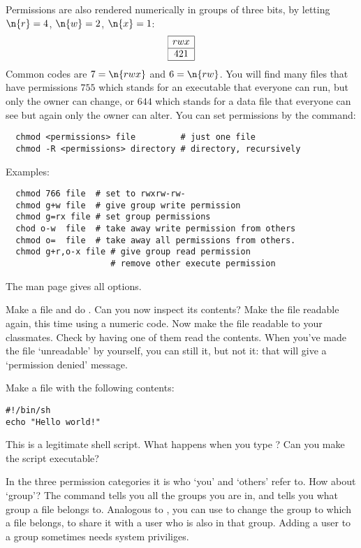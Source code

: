 Permissions are also rendered
numerically in groups of three bits, by letting $\n{r}=4$, $\n{w}=2$,
$\n{x}=1$:
\[ \begin{array}{|c|}
  \hline rwx\\ \hline 421 \\ \hline
\end{array}
\]
Common codes are $7=\n{rwx}$ and $6=\n{rw}$. You will find
many files that have permissions $755$ which stands for an executable
that everyone can run, but only the owner can change, or $644$ which
stands for a data file that everyone can see but again only the owner
can alter. You can set permissions by the  command:
\begin{verbatim}
  chmod <permissions> file         # just one file
  chmod -R <permissions> directory # directory, recursively
\end{verbatim}
Examples:
\begin{verbatim}
  chmod 766 file  # set to rwxrw-rw-
  chmod g+w file  # give group write permission
  chmod g=rx file # set group permissions
  chod o-w  file  # take away write permission from others
  chmod o=  file  # take away all permissions from others.
  chmod g+r,o-x file # give group read permission
                     # remove other execute permission
\end{verbatim}
The man page gives all options.

\practical
{Make a file  and do . Can you now inspect its
contents? Make the file readable again, this time using a numeric
code. Now make the file readable to your classmates. Check by having
one of them read the contents.}
{When you've made the file `unreadable'
  by yourself, you can still  it, but not  it: that will
  give a `permission denied' message.}{}

Make a file  with the following contents:
\begin{verbatim}
#!/bin/sh
echo "Hello world!"
\end{verbatim}
This is a legitimate shell script. What happens when you type
? Can you make the script executable?

In the three permission categories it is who `you' and `others'
refer to. How about `group'? The command 
tells you all the groups you are in, and  tells you
what group a file belongs to. Analogous to ,
you can use  to change the group to
which a file belongs, to share it with a user who is also in that group.
Adding a user to a group sometimes needs system priviliges.

